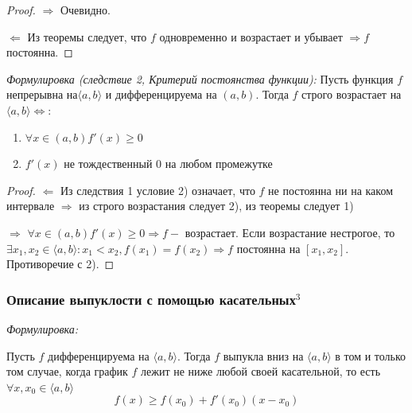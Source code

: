 \documentclass{article}
\begin{document}
\begin{proof}
\item{$\Rightarrow$} Очевидно.
\item{$\Leftarrow$} Из теоремы следует, что $f$ одновременно и возрастает и убывает $\Rightarrow f$ постоянна. 
\end{proof}

\textit{Формулировка (следствие 2, Критерий постоянства функции): }
Пусть функция $f$ непрерывна на$ \langle a, b\rangle$ и дифференцируема на $(a, b)$. Тогда $f$ строго возрастает на 
$\langle a, b\rangle \Leftrightarrow$:

\begin{enumerate}
    \item $\forall x \in (a, b) f'(x) \geq 0$
    \item $f'(x) $ не тождественный $ 0 $ на любом промежутке
\end{enumerate}

\begin{proof}
\item{$\Leftarrow$}
Из следствия 1 условие 2) означает, что $f$ не постоянна ни на каком интервале $\Rightarrow $ из строго возрастания следует 2), из теоремы следует 1)
\item{$\Rightarrow$}
$\forall x \in (a, b) f'(x) \geq 0 \Rightarrow f -$ возрастает. Если возрастание нестрогое, то $\exists x_1, x_2 \in \langle a, b\rangle: x_1<x_2, f(x_1) = f(x_2) \Rightarrow f $ постоянна на $[x_1, x_2]$. Противоречие с 2).
\end{proof}

\subsubsection{Описание выпуклости с помощью касательных\texorpdfstring{$^3$}{}}

\textit{Формулировка:}

Пусть $f$ дифференцируема на $\langle a, b\rangle$. Тогда $f$ выпукла вниз на $\langle a, b\rangle$ в том и только том случае, когда график $f$ лежит не ниже любой своей касательной, то есть $\forall x, x_0 \in \langle a, b\rangle$
\begin{equation}\label{eq_a}
f(x) \geq f(x_0) + f'(x_0)(x-x_0)
\end{equation}
\end{document}
